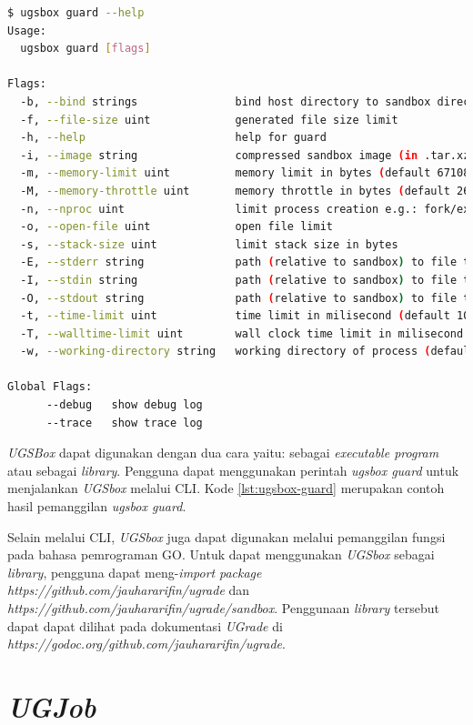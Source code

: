 \begin{lstlisting}[caption={Contoh Hasil Eksekusi Perintah \textit{ugsbox}},label={lst:ugsbox-guard},language=Bash,style=BashStyle]
$ ugsbox guard --help
Usage:
  ugsbox guard [flags]

Flags:
  -b, --bind strings               bind host directory to sandbox directory with format <hostdir>:<sandboxdir>. Warning: file owner of binded directory will be changed
  -f, --file-size uint             generated file size limit
  -h, --help                       help for guard
  -i, --image string               compressed sandbox image (in .tar.xz) path
  -m, --memory-limit uint          memory limit in bytes (default 67108864)
  -M, --memory-throttle uint       memory throttle in bytes (default 268435456)
  -n, --nproc uint                 limit process creation e.g.: fork/exec
  -o, --open-file uint             open file limit
  -s, --stack-size uint            limit stack size in bytes
  -E, --stderr string              path (relative to sandbox) to file to be used as stderr
  -I, --stdin string               path (relative to sandbox) to file to be used as stdin
  -O, --stdout string              path (relative to sandbox) to file to be used as stdout
  -t, --time-limit uint            time limit in milisecond (default 10000)
  -T, --walltime-limit uint        wall clock time limit in milisecond (default 10000)
  -w, --working-directory string   working directory of process (default "/home")

Global Flags:
      --debug   show debug log
      --trace   show trace log
\end{lstlisting}

\par \textit{UGSBox} dapat digunakan dengan dua cara yaitu: sebagai \textit{executable program} atau sebagai \textit{library}. Pengguna dapat menggunakan perintah \textit{ugsbox guard} untuk menjalankan \textit{UGSbox} melalui CLI. Kode \ref{lst:ugsbox-guard} merupakan contoh hasil pemanggilan \textit{ugsbox guard}.

\par Selain melalui CLI, \textit{UGSbox} juga dapat digunakan melalui pemanggilan fungsi pada bahasa pemrograman GO. Untuk dapat menggunakan \textit{UGSbox} sebagai \textit{library}, pengguna dapat meng-\textit{import} \textit{package https://github.com/jauhararifin/ugrade} dan \textit{https://github.com/jauhararifin/ugrade/sandbox}. Penggunaan \textit{library} tersebut dapat dapat dilihat pada dokumentasi \textit{UGrade} di \textit{https://godoc.org/github.com/jauhararifin/ugrade}.

\section{\textit{UGJob}}